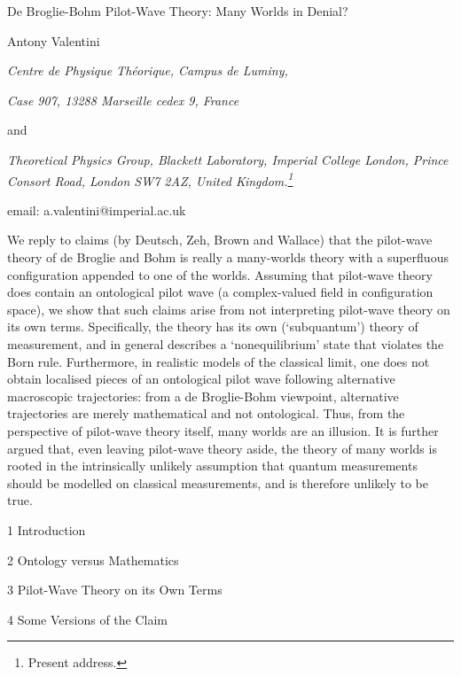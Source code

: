 \documentclass{article}%
\begin{document}
\author{Antony Valentini\\Augustus College}

\begin{center}
{\LARGE De Broglie-Bohm Pilot-Wave Theory: Many Worlds in Denial?}

\bigskip

Antony Valentini

\bigskip

\textit{Centre de Physique Th\'{e}orique, Campus de Luminy,}

\textit{Case 907, 13288 Marseille cedex 9, France}

and

\textit{Theoretical Physics Group, Blackett Laboratory, Imperial College
London, Prince Consort Road, London SW7 2AZ, United Kingdom.\footnote{Present
address.}}

email: a.valentini@imperial.ac.uk

\bigskip
\end{center}

We reply to claims (by Deutsch, Zeh, Brown and Wallace) that the pilot-wave
theory of de Broglie and Bohm is really a many-worlds theory with a
superfluous configuration appended to one of the worlds. Assuming that
pilot-wave theory does contain an ontological pilot wave (a complex-valued
field in configuration space), we show that such claims arise from not
interpreting pilot-wave theory on its own terms. Specifically, the theory has
its own (`subquantum') theory of measurement, and in general describes a
`nonequilibrium' state that violates the Born rule. Furthermore, in realistic
models of the classical limit, one does not obtain localised pieces of an
ontological pilot wave following alternative macroscopic trajectories: from a
de Broglie-Bohm viewpoint, alternative trajectories are merely mathematical
and not ontological. Thus, from the perspective of pilot-wave theory itself,
many worlds are an illusion. It is further argued that, even leaving
pilot-wave theory aside, the theory of many worlds is rooted in the
intrinsically unlikely assumption that quantum measurements should be modelled
on classical measurements, and is therefore unlikely to be true.

\bigskip

\bigskip

1 Introduction

2 Ontology versus Mathematics

3 Pilot-Wave Theory on its Own Terms

4 Some Versions of the Claim
\end{document}
